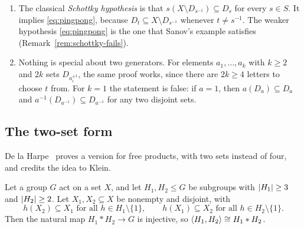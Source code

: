 \begin{remark}\label{rem:variants}
\begin{enumerate}
\item The classical \emph{Schottky hypothesis} is that
$s(X \setminus D_{s^{-1}}) \subseteq D_s$ for every $s \in S$. It implies
\eqref{eq:pingpong}, because $D_t \subseteq X \setminus D_{s^{-1}}$ whenever
$t \ne s^{-1}$. The weaker hypothesis \eqref{eq:pingpong} is the one that
Sanov's example satisfies (Remark~\ref{rem:schottky-fails}).
\item Nothing is special about two generators. For elements
$a_1, \dots, a_k$ with $k \ge 2$ and $2k$ sets $D_{a_i^{\pm1}}$, the same proof
works, since there are $2k \ge 4$ letters to choose $t$ from. For $k = 1$ the
statement is false: if $a = 1$, then $a(D_a) \subseteq D_a$ and
$a^{-1}(D_{a^{-1}}) \subseteq D_{a^{-1}}$ for any two disjoint sets.
\end{enumerate}
\end{remark}

\subsection{The two-set form}
De la Harpe~\cite{delaharpe-2000} proves a version for free products, with two
sets instead of four, and credits the idea to Klein.

\begin{theorem}\label{thm:tabletennis}
Let a group $G$ act on a set $X$, and let $H_1, H_2 \le G$ be subgroups with
$\left|H_1\right| \ge 3$ and $\left|H_2\right| \ge 2$. Let $X_1, X_2 \subseteq X$ be nonempty
and disjoint, with
\[
  h(X_2) \subseteq X_1 \text{ for all } h \in H_1 \setminus \{1\}, \qquad
  h(X_1) \subseteq X_2 \text{ for all } h \in H_2 \setminus \{1\}.
\]
Then the natural map $H_1 * H_2 \to G$ is injective, so
$\langle H_1, H_2 \rangle \cong H_1 * H_2$.
\end{theorem}

